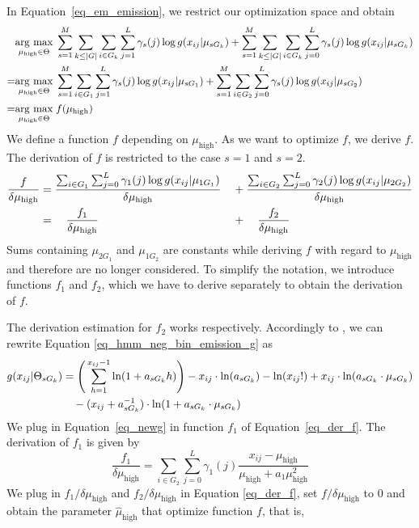 In Equation~\ref{eq_em_emission}, we restrict our optimization space and obtain 
\begin{align}
& \underset{\mu_{\text{high}} \in \Theta}{\operatorname{arg}\,\operatorname{max}}\;  \sum_{s=1}^M \sum_{k \leq |G|} \sum_{i \in G_k} \sum_{j=1}^L \gamma_s(j) \log g(x_{ij} | \mu_{sG_k}) \notag + \sum_{s=1}^M \sum_{k \leq |G|} \sum_{i \in G_k} \sum_{j=0}^L \gamma_s(j) \log g(x_{ij} | \mu_{sG_k}) \\\notag
= & \underset{\mu_{\text{high}} \in \Theta}{\operatorname{arg}\,\operatorname{max}}\; \sum_{s=1}^M \sum_{i \in G_1} \sum_{j=1}^L \gamma_s(j) \log g(x_{ij} | \mu_{sG_1}) + \sum_{s=1}^M \sum_{i \in G_2} \sum_{j=0}^L \gamma_s(j) \log g(x_{ij} | \mu_{sG_2}) \\\notag 
= & 
\underset{\mu_{\text{high}} \in \Theta}{\operatorname{arg}\,\operatorname{max}}\; f(\mu_{\text{high}}) \notag 
\end{align}
\noindent  We define a function $f$ depending on $\mu_{\text{high}}$.
As we want to optimize $f$, we derive $f$.
The derivation of $f$ is restricted to the case $s=1$ and $s=2$.
\begin{align}
\frac{f}{\delta \mu_{\text{high}} } &=  \frac{\sum_{i \in G_1} \sum_{j=0}^L \gamma_1(j) \log g(x_{ij} | \mu_{1G_1})}{\delta \mu_{\text{high}} }&&+ \frac{\sum_{i \in G_2} \sum_{j=0}^L \gamma_2(j) \log g(x_{ij} | \mu_{2G_2})}{\delta \mu_{\text{high}} }\notag \\
&=\quad  \frac{f_1}{\delta \mu_{\text{high}}} &&+ \quad \frac{f_2}{\delta \mu_{\text{high}}} \label{eq_der_f}
\end{align}
\noindent  Sums containing $\mu_{2G_1}$ and $\mu_{1G_2}$ are constants while deriving $f$ with regard to $\mu_{\text{high}}$ and therefore are no longer considered. 
To simplify the notation, we introduce functions $f_1$ and $f_2$, which we have to derive separately to obtain the derivation of $f$.

\noindent  The derivation estimation for $f_2$ works respectively.
Accordingly to \cite{Ismail2007}, we can rewrite Equation \ref{eq_hmm_neg_bin_emission_g} as
\begin{align}
g(x_{ij} | \Theta_{sG_k}) &= \Bigg( \sum_{h=1}^{x_{ij} - 1}  \ln(1 + a_{sG_k}h)\Bigg) - x_{ij} \cdot \ln(a_{sG_k}) - \ln(x_{ij}!) + x_{ij} \cdot \ln(a_{sG_k} \cdot \mu_{sG_k}) \notag \\
&\quad- (x_{ij} + a_{sG_k}^{-1}) \cdot \ln(1 + a_{sG_k} \cdot \mu_{sG_k}) \label{eq_newg}
\end{align}
\noindent 
We plug in Equation~\ref{eq_newg} in function $f_1$ of Equation~\ref{eq_der_f}.
The derivation of $f_1$ is given by
$$\frac{f_1}{\delta \mu_{\text{high}}} = \sum_{i \in G_2} \sum_{j=0}^L \gamma_1(j) \frac{x_{ij} - \mu_{\text{high}}}{\mu_{\text{high}} + a_{1} \mu_{\text{high}}^2}$$
\noindent  
We plug in $f_1/\delta \mu_{\text{high}}$ and $f_2/\delta\mu_{\text{high}}$ in Equation \ref{eq_der_f}, set $f/\delta \mu_{\text{high}}$ to 0 and obtain the parameter $\hat{\mu}_\text{high}$ that optimize function $f$, that is,


